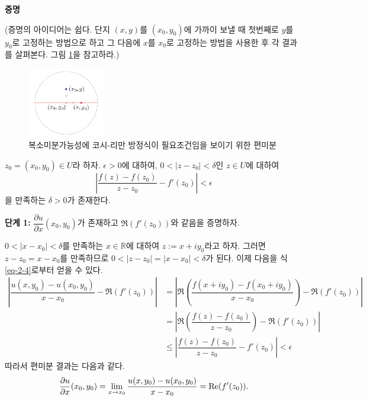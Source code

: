 \newpage

{\bf 증명}

(증명의 아이디어는 쉽다. 단지 $(x,y)$를 $(x_0, y_0)$에 가까이 보낼 때
첫번째로 $y$를 $y_0$로 고정하는 방법으로 하고 그 다음에 
$x$를 $x_0$로 고정하는 방법을 사용한 후 각 결과를 살펴본다.
그림 \ref{fig-2-6}을 참고하라.)

\begin{figure}[!h]
\begin{center}
\includegraphics[width=0.3\textwidth]{./SaltChapter/figs/fig-2-6}
\end{center}
\caption{복소미분가능성에  코시-리만 방정식이 필요조건임을 보이기 위한 편미분}
\label{fig-2-6}
\end{figure}

$z_0 = (x_0, y_0)\in U$라 하자.
$\epsilon>0$에 대하여, 
$0<|z-z_0|<\delta$인 $z\in U$에 대하여
\begin{equation}\label{eq-2-4}
\left| \dfrac{f(z)-f(z_0)}{z-z_0} - f'(z_0) \right| < \epsilon
\end{equation}
을 만족하는 $\delta >0$가 존재한다.

{\bf 단계 1:}
$\dfrac{\partial u}{\partial x}(x_0,y_0)$가 존재하고 $\Re(f'(z_0))$와 같음을 증명하자.

$0<|x-x_0|<\delta$를 만족하는 $x\in\mathbb R$에 대하여 $z:=x+iy_0$라고 하자.
그러면 $z-z_0 = x-x_0$를 만족하므로
$0<|z-z_0| = |x-x_0| < \delta$가 된다.
이제 다음을 식 \eqref{eq-2-4}로부터 얻을 수 있다. 
\begin{align*}
\left| \dfrac{u(x,y_0) - u(x_0, y_0)}{x-x_0} - \Re(f'(z_0)) \right| 
&= \left| \Re\left(\dfrac{f(x+iy_0)-f(x_0+iy_0)}{x-x_0}\right) - \Re(f'(z_0)) \right| \\
&= \left| \Re\left(\dfrac{f(z)-f(z_0)}{z-z_0}\right) - \Re(f'(z_0)) \right| \\
&\le \left| \dfrac{f(z)-f(z_0)}{z-z_0} - f'(z_0) \right| < \epsilon 
\end{align*}
따라서 편미분 결과는 다음과 같다.
\[
\dfrac{\partial u}{\partial x}(x_0, y_0) 
= \lim_{x\to x_0} \dfrac{u(x,y_0) - u(x_0, y_0)}{x-x_0} \\
= \Re(f'(z_0)).
\]

